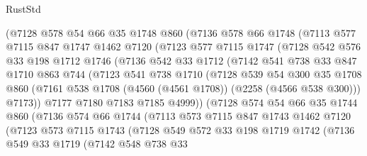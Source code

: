 \begin{lexlean}{RustStd}
\begin{coremodule}
        (@7128
          @578
          @54
          @66
          @35
          @1748
          @860
          (@7136
            @578
            @66
            @1748
            (@7113
              @577
              @7115
              @847
              @1747
              @1462
              @7120
              (@7123
                @577
                @7115
                @1747
                (@7128
                  @542
                  @576
                  @33
                  @198
                  @1712
                  @1746
                  (@7136
                    @542
                    @33
                    @1712
                    (@7142
                      @541
                      @738
                      @33
                      @847
                      @1710
                      @863
                      @744
                      (@7123
                        @541
                        @738
                        @1710
                        (@7128
                          @539
                          @54
                          @300
                          @35
                          @1708
                          @860
                          (@7161 @538 @1708 (@4560 (@4561 @1708)) (@2258 (@4566 @538 @300)))
                          @7173))
                      @7177
                      @7180
                      @7183
                      @7185
                      @4999))
                  (@7128
                    @574
                    @54
                    @66
                    @35
                    @1744
                    @860
                    (@7136
                      @574
                      @66
                      @1744
                      (@7113
                        @573
                        @7115
                        @847
                        @1743
                        @1462
                        @7120
                        (@7123
                          @573
                          @7115
                          @1743
                          (@7128
                            @549
                            @572
                            @33
                            @198
                            @1719
                            @1742
                            (@7136
                              @549
                              @33
                              @1719
                              (@7142
                                @548
                                @738
                                @33

\end{coremodule}
\end{lexlean}
